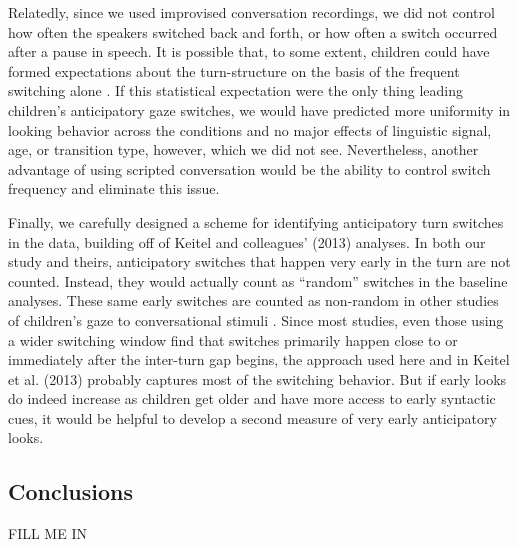 \documentclass[authoryear, 12pt]{elsarticle}
\begin{document}
Relatedly, since we used improvised conversation recordings, we did not control how often the speakers switched back and forth, or how often a switch occurred after a pause in speech. It is possible that, to some extent, children could have formed expectations about the turn-structure on the basis of the frequent switching alone \citep[see, e.g., ][]{thorgrimssonUndRev}. If this statistical expectation were the only thing leading children's anticipatory gaze switches, we would have predicted more uniformity in looking behavior across the conditions and no major effects of linguistic signal, age, or transition type, however, which we did not see. Nevertheless, another advantage of using scripted conversation would be the ability to control switch frequency and eliminate this issue. 

Finally, we carefully designed a scheme for identifying anticipatory turn switches in the data, building off of Keitel and colleagues' (2013) analyses. In both our study and theirs, anticipatory switches that happen very early in the turn are not counted. Instead, they would actually count as ``random'' switches in the baseline analyses. These same early switches are counted as non-random in other studies of children's gaze to conversational stimuli \citep{bakker2011, hofsten2009}. Since most studies, even those using a wider switching window \citep[e.g., ][]{hirvenkari2013} find that switches primarily happen close to or immediately after the inter-turn gap begins, the approach used here and in Keitel et al. (2013) probably captures most of the switching behavior. But if early looks do indeed increase as children get older and have more access to early syntactic cues, it would be helpful to develop a second measure of very early anticipatory looks.

\subsection{Conclusions}

FILL ME IN 




\end{document}
